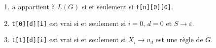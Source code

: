 \documentclass[preview, varwidth=500px, convert={outfile=\jobname.png}, border=2pt]{standalone}
\begin{document}
\begin{enumerate}
    \item $u$ appartient à $L(G)$ si et seulement si \texttt{t[n][0][0]}.
    \item \texttt{t[0][d][i]} est vrai si et seulement si $i = 0$, $d = 0$ et $S \rightarrow \varepsilon$.
    \item \texttt{t[1][d][i]} est vrai si et seulement si $X_i \rightarrow u_d$ est une règle de $G$.
\end{enumerate}
\end{document}
